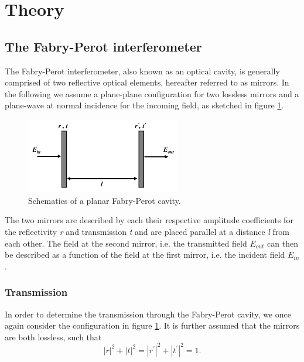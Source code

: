 \section{Theory}
\subsection{The Fabry-Perot interferometer}\label{sec:fabry_perot}

The Fabry-Perot interferometer, also known as an optical cavity, is generally comprised of two reflective optical elements, hereafter referred to as mirrors. In the following we assume a plane-plane configuration for two lossless mirrors and a plane-wave at normal incidence for the incoming field, as sketched in figure \ref{fig:planar_fabry-perot}. 

\begin{figure}[h!]
    \centering
    \includegraphics[width=0.6\textwidth]{figures/planar_fabry_perot.pdf}
    \caption{Schematics of a planar Fabry-Perot cavity.}
    \label{fig:planar_fabry-perot}
\end{figure}

The two mirrors are described by each their respective amplitude coefficients for the reflectivity \emph{r} and transmission \emph{t} and are placed parallel at a distance \emph{l} from each other. The field at the second mirror, i.e. the transmitted field $E_{out}$ can then be described as a function of the field at the first mirror, i.e. the incident field $E_{in}$\cite{Eichhorn,Pedrotti}. 

\subsubsection{Transmission}

In order to determine the transmission through the Fabry-Perot cavity, we once again consider the configuration in figure \ref{fig:planar_fabry-perot}. It is further assumed that the mirrors are both lossless, such that
\begin{equation}
    |r|^2 + |t|^2 = |r^{\prime}|^2 + |t^{\prime}|^2 = 1.
    \label{eq:lossless_condition}
\end{equation}

